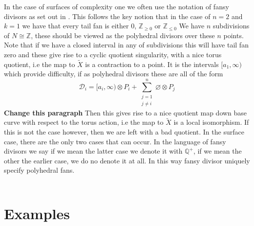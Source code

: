 \documentclass[12pt,a4paper]{book}      %
\theoremstyle{definition}
\newcommand{\wt}[1]{\widetilde #1}
\begin{document}
In the case of surfaces of complexity one we often use the notation of fansy divisors as set out in \cite{Suss}. This follows the key notion that in the case of $n=2$ and $k=1$ we have that every tail fan is either $0$, $\mathbb{Z}_{\geq 0 }$ or $\mathbb{Z}_{\leq 0}$ We have $n$ subdivisions of $N \cong \mathbb{Z}$, these should be viewed as the polyhedral divisors over these $n$ points. Note that if we have a closed interval in any of subdivisions this will have tail fan zero and these give rise to a cyclic quotient singularity, with a nice torus quotient, i.e the map to $\wt{X}$ is a contraction to a point. It is the intervals $[a_1, \infty )$ which provide difficulty, if as polyhedral divisors these are all of the form 
\[
\mathcal{D}_i = [a_i, \infty) \otimes P_i + \sum_{\substack{j = 1 \\ j \neq i}}^n \varnothing \otimes P_j
\]
\textbf{Change this paragraph}
Then this gives rise to a nice quotient map down base curve with respect to the torus action, i.e  the map to $\wt{X}$ is a local isomorphism. If this is not the case however, then we are left with a bad quotient. In the surface case, there are the only two cases that can occur. In the language of fansy divisors we say if we mean the latter case we denote it with $\mathbb{Q}^+$, if we mean the other the earlier case, we do no denote it at all. In this way fansy divisor uniquely specify polyhedral fans.
\\
\\
\section{Examples}
\end{document}
